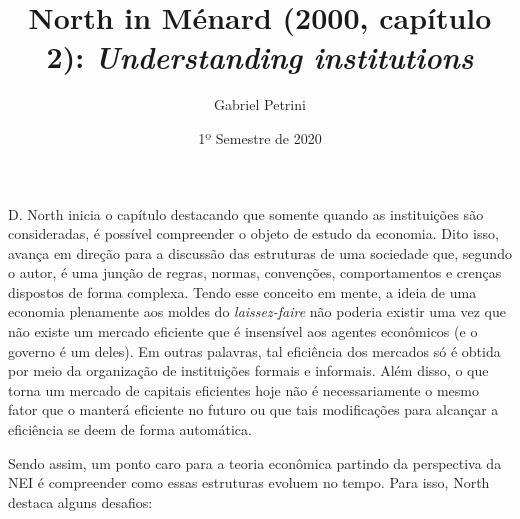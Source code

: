 \documentclass[9pt,twocolumn,twoside,lineno]{style}
\title{North in Ménard (2000, capítulo 2): \textit{Understanding institutions}}
\date{1º Semestre de 2020}
\author[$\ddagger$]{Gabriel Petrini}
\affil[$\ddagger$]{Doutorando no instituto de Economia da Unicamp}
\begin{document}
\maketitle
\articletypemark
\marginmark
\thispagestyle{firststyle}


	

D. North inicia o capítulo destacando que somente quando as instituições são consideradas, é possível compreender o objeto de estudo da economia. Dito isso, avança em direção para a discussão das estruturas de uma sociedade que, segundo o autor, é uma junção de regras, normas, convenções, comportamentos e crenças dispostos de forma complexa. Tendo esse conceito em mente, a ideia de uma economia plenamente aos moldes do \textit{laissez-faire} não poderia existir uma vez que não existe um mercado eficiente que é insensível aos agentes econômicos (e o governo é um deles). Em outras palavras, tal eficiência dos mercados só é obtida por meio da organização de instituições formais e informais. Além disso, o que torna um mercado de capitais eficientes hoje não é necessariamente o mesmo fator que o manterá eficiente no futuro ou que tais modificações para alcançar a eficiência se deem de forma automática.
	
Sendo assim, um ponto caro para a teoria econômica partindo da perspectiva da NEI é compreender como essas estruturas evoluem no tempo. Para isso, North destaca alguns desafios:
\end{document}
